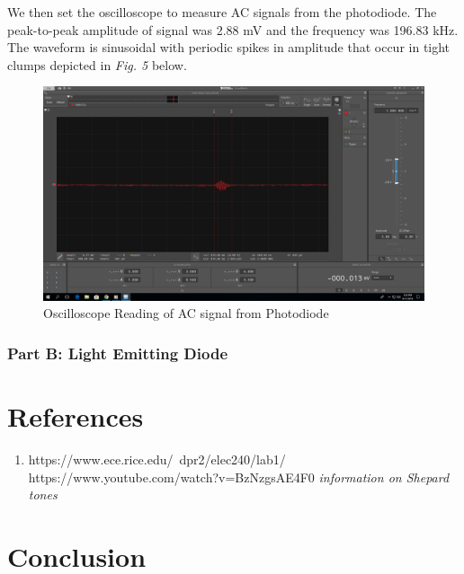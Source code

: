 \documentclass[10pt]{article}
\begin{document}
We then set the oscilloscope to measure AC signals from the photodiode. The peak-to-peak amplitude of signal was 2.88 mV and the frequency was 196.83 kHz. The waveform is sinusoidal with periodic spikes in amplitude that occur in tight clumps depicted in \textit{Fig. 5} below. 
\begin{center}
	\begin{figure}
		\centering
		\includegraphics[scale = 0.22]{images/zoom.png}
		\caption{Oscilloscope Reading of AC signal from Photodiode}
		\label{fig:zoom}
	\end{figure}
\end{center}

\subsubsection{Part B: Light Emitting Diode}


\medskip


\section{References}

	\begin{enumerate}
		\item https://www.ece.rice.edu/~dpr2/elec240/lab1/
		https://www.youtube.com/watch?v=BzNzgsAE4F0 \textit{information on Shepard tones}
	\end{enumerate}
\medskip


\section{Conclusion}
\end{document}
